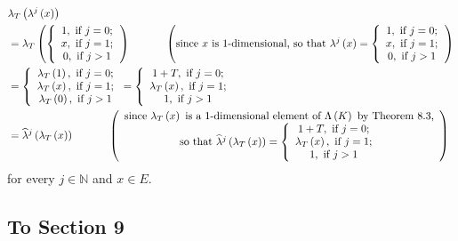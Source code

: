 \documentclass[numbers=enddot,12pt,final,onecolumn,notitlepage]{scrartcl}%
\begin{document}
\begin{align*}
&  \lambda_{T}\left(  \lambda^{j}\left(  x\right)  \right) \\
&  =\lambda_{T}\left(  \left\{
\begin{array}
[c]{c}%
1,\text{ if }j=0;\\
x,\text{ if }j=1;\\
0,\text{ if }j>1
\end{array}
\right.  \right)  \ \ \ \ \ \ \ \ \ \ \left(  \text{since }x\text{ is
}1\text{-dimensional, so that }\lambda^{j}\left(  x\right)  =\left\{
\begin{array}
[c]{c}%
1,\text{ if }j=0;\\
x,\text{ if }j=1;\\
0,\text{ if }j>1
\end{array}
\right.  \right) \\
&  =\left\{
\begin{array}
[c]{c}%
\lambda_{T}\left(  1\right)  ,\text{ if }j=0;\\
\lambda_{T}\left(  x\right)  ,\text{ if }j=1;\\
\lambda_{T}\left(  0\right)  ,\text{ if }j>1
\end{array}
\right.  =\left\{
\begin{array}
[c]{c}%
1+T,\text{ if }j=0;\\
\lambda_{T}\left(  x\right)  ,\text{ if }j=1;\\
1,\text{ if }j>1
\end{array}
\right. \\
&  =\widehat{\lambda}^{j}\left(  \lambda_{T}\left(  x\right)  \right)
\ \ \ \ \ \ \ \ \ \ \left(
\begin{array}
[c]{c}%
\text{since }\lambda_{T}\left(  x\right)  \text{ is a }1\text{-dimensional
element of }\Lambda\left(  K\right)  \text{ by Theorem 8.3,}\\
\text{so that }\widehat{\lambda}^{j}\left(  \lambda_{T}\left(  x\right)
\right)  =\left\{
\begin{array}
[c]{c}%
1+T,\text{ if }j=0;\\
\lambda_{T}\left(  x\right)  ,\text{ if }j=1;\\
1,\text{ if }j>1
\end{array}
\right.
\end{array}
\right)
\end{align*}
for every $j\in\mathbb{N}$ and $x\in E.$

\subsection{To Section 9}
\end{document}
